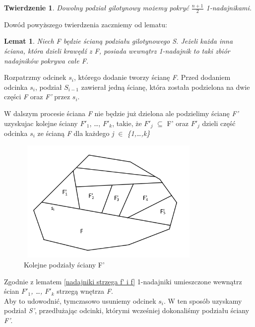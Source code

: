\documentclass[brudnopis]{xmgr}
\newtheorem{Twierdzenie}{Twierdzenie}
\newtheorem{Lemat}{Lemat}
\begin{document}
\begin{Twierdzenie}
  Dowolny podział gilotynowy możemy pokryć $\frac{n+1}{2}$ 1-nadajnikami.
\end{Twierdzenie}
Dowód powyższego twierdzenia zaczniemy od lematu:
\begin{Lemat}\label{sasiednie sciany strzega F}
  Niech F będzie ścianą podziału gilotynowego S. Jeżeli każda inna ściana, która dzieli krawędź z F, posiada wewnątrz 1-nadajnik to taki zbiór nadajników pokrywa całe F.
\end{Lemat}\label{nadajniki strzega f' i f}
\indent Rozpatrzmy odcinek $s_i$, którego dodanie tworzy ścianę \textit{F}. Przed dodaniem odcinka $s_i$, podział $S_{i-1}$ zawierał jedną ścianę, która została podzielona na dwie części \textit{F} oraz \textit{F'} przez $s_i$. 


W dalszym procesie ściana \textit{F} nie będzie już dzielona ale podzielimy ścianę \textit{F'} uzyskujac kolejne ściany $F'_1$, \ldots, $F'_k$, takie, że $F'_j$ $\subseteq$ F' oraz $F'_j$ dzieli część odcinka $s_i$ ze ścianą \textit{F} dla każdego \textit{j $\in$ \{1,\ldots,k\}}

\begin{figure}[ht!]
  \centering
  \label{podzial F' na kolejne ściany}
  \includegraphics[width=9cm,height=6cm]{rysunki/podzial_F'.png}
  \caption{Kolejne podziały ściany F'}
\end{figure} 
Zgodnie z lematem \ref{nadajniki strzega f' i f} 1-nadajniki umieszczone wewnątrz ścian \textit{$F'_1$, \ldots, $F'_k$} strzegą wnętrza \textit{F}. 
\\Aby to udowodnić, tymczasowo usuniemy odcinek $s_i$. W ten sposób uzyskamy podział \textit{S'}, przedłużając odcinki, którymi wcześniej dokonaliśmy podziału ściany \textit{F'}.
\end{document}
